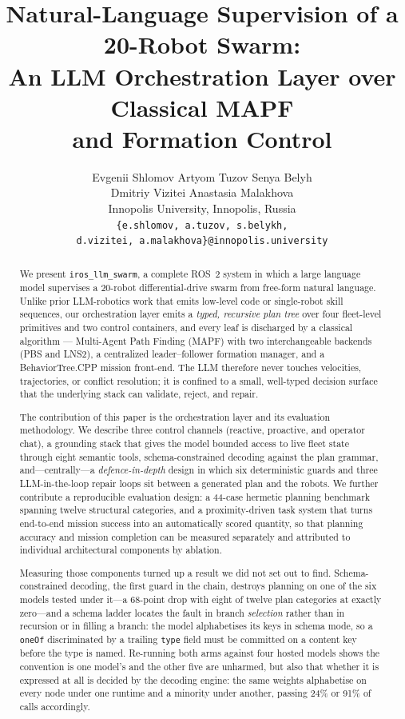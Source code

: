 \documentclass[10pt,twocolumn]{article}
\title{\vspace{-2em}\bfseries Natural-Language Supervision of a 20-Robot Swarm:\\
An LLM Orchestration Layer over Classical MAPF\\ and Formation Control}
\author{
Evgenii Shlomov \quad Artyom Tuzov \quad Senya Belyh\\
Dmitriy Vizitei \quad Anastasia Malakhova\\[0.3em]
\small Innopolis University, Innopolis, Russia\\
\small \texttt{\{e.shlomov, a.tuzov, s.belykh,}\\
\small \texttt{d.vizitei, a.malakhova\}@innopolis.university}
}
\date{}
\newcommand{\code}[1]{\texttt{\small #1}}
\begin{document}
\maketitle

\begin{abstract}
We present \code{iros\_llm\_swarm}, a complete ROS~2 system in which a large
language model supervises a 20-robot differential-drive swarm from free-form
natural language. Unlike prior LLM-robotics work that emits low-level code or
single-robot skill sequences, our orchestration layer emits a \emph{typed,
recursive plan tree} over four fleet-level primitives and two control
containers, and every leaf is
discharged by a classical algorithm --- Multi-Agent Path Finding (MAPF) with
two interchangeable backends (PBS and LNS2), a centralized leader--follower
formation manager, and a BehaviorTree.CPP mission front-end. The LLM therefore
never touches velocities, trajectories, or conflict resolution; it is confined
to a small, well-typed decision surface that the underlying stack can validate,
reject, and repair.

The contribution of this paper is the orchestration layer and its evaluation
methodology. We describe three control channels (reactive, proactive, and
operator chat), a grounding stack that gives the model bounded access
to live fleet state through eight semantic tools, schema-constrained decoding
against the plan grammar, and---centrally---a \emph{defence-in-depth} design in
which six deterministic guards and three LLM-in-the-loop repair loops sit
between a generated plan and the robots. We further contribute a reproducible
evaluation design: a 44-case hermetic planning benchmark spanning twelve
structural categories, and a proximity-driven task system that
turns end-to-end mission success into an automatically scored quantity, so that
planning accuracy and mission completion can be measured separately and
attributed to individual architectural components by ablation.

Measuring those components turned up a result we did not set out to find.
Schema-constrained decoding, the first guard in the chain, destroys planning
on one of the six models tested under it---a 68-point drop with eight of
twelve plan categories at exactly zero---and a schema ladder locates the fault
in branch \emph{selection} rather than in recursion or in filling a branch:
the model alphabetises its keys in schema mode, so a \code{oneOf} discriminated
by a trailing \code{type} field must be committed on a content key before the
type is named. Re-running both arms against four hosted models shows the
convention is one model's and the other five are unharmed, but also that
whether it is expressed at all is decided by the decoding engine: the same
weights alphabetise on every node under one runtime and a minority under
another, passing 24\% or 91\% of calls accordingly.


\end{abstract}
\end{document}
